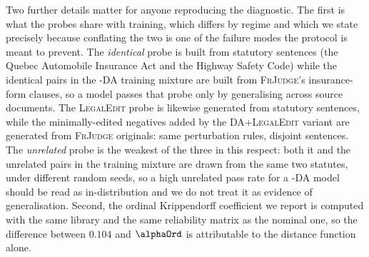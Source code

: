 \documentclass[11pt]{article}
\begin{document}
Two further details matter for anyone reproducing the diagnostic. The first is
what the probes share with training, which differs by regime and which we state
precisely because conflating the two is one of the failure modes the protocol is
meant to prevent. The \emph{identical} probe is built from statutory sentences
(the Quebec Automobile Insurance Act and the Highway Safety Code) while the
identical pairs in the \textsc{-DA} training mixture are built from
\textsc{FrJudge}'s insurance-form clauses, so a model passes that probe only by
generalising across source documents. The \textsc{LegalEdit} probe is likewise
generated from statutory sentences, while the minimally-edited negatives added
by the \textsc{DA+LegalEdit} variant are generated from \textsc{FrJudge}
originals: same perturbation rules, disjoint sentences. The \emph{unrelated}
probe is the weakest of the three in this respect: both it and the unrelated
pairs in the training mixture are drawn from the same two statutes, under
different random seeds, so a high unrelated pass rate for a \textsc{-DA} model
should be read as in-distribution and we do not treat it as evidence of
generalisation. Second, the ordinal Krippendorff coefficient we report is
computed with the same library and the same reliability matrix as the nominal
one, so the difference between $0.104$ and $\alphaOrd$ is attributable to the
distance function alone.
\end{document}

